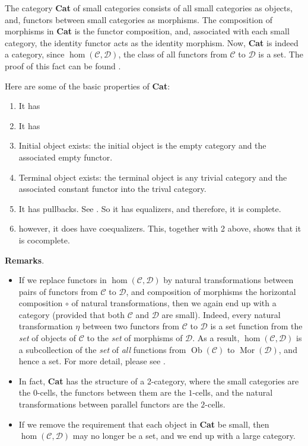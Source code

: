 \documentclass[12pt]{article}
\begin{document}
The category \textbf{Cat} of small categories consists of all small categories as objects, and, functors between small categories as morphisms.  The composition of morphisms in \textbf{Cat} is the functor composition, and, associated with each small category, the identity functor acts as the identity morphism.  Now, \textbf{Cat} is indeed a category, since $\hom(\mathcal{C},\mathcal{D})$, the class of all functors from $\mathcal{C}$ to $\mathcal{D}$ is a set.  The proof of this fact can be found .

Here are some of the basic properties of \textbf{Cat}:
\begin{enumerate}
\item It has 
\item It has 
\item Initial object exists: the initial object is the empty category and the associated empty functor.
\item Terminal object exists: the terminal object is any trivial category and the associated constant functor into the trival category.
\item It has pullbacks.  See .  So it has equalizers, and therefore, it is complete.
\item however, it does have coequalizers.  This, together with 2 above, shows that it is cocomplete.
\end{enumerate}

\textbf{Remarks}.  
\begin{itemize}
\item
If we replace functors in $\hom(\mathcal{C},\mathcal{D})$ by natural transformations between pairs of functors from $\mathcal{C}$ to $\mathcal{D}$, and composition of morphisms the horizontal composition $\circ$ of natural transformations, then we again end up with a category (provided that both $\mathcal{C}$ and $\mathcal{D}$ are small).  Indeed, every natural transformation $\eta$ between two functors from $\mathcal{C}$ to $\mathcal{D}$ is a set function from the \emph{set} of objects of $\mathcal{C}$ to the \emph{set} of morphisms of $\mathcal{D}$.  As a result, $\hom(\mathcal{C},\mathcal{D})$ is a subcollection of the \emph{set} of \emph{all} functions from $\operatorname{Ob}(\mathcal{C})$ to $\operatorname{Mor}(\mathcal{D})$, and hence a set.  For more detail, please see .
\item
In fact, \textbf{Cat} has the structure of a 2-category, where the small categories are the $0$-cells, the functors between them are the $1$-cells, and the natural transformations between parallel functors are the $2$-cells.
\item
If we remove the requirement that each object in \textbf{Cat} be small, then $\hom(\mathcal{C},\mathcal{D})$ may no longer be a set, and we end up with a large category.
\end{itemize}
\end{document}
